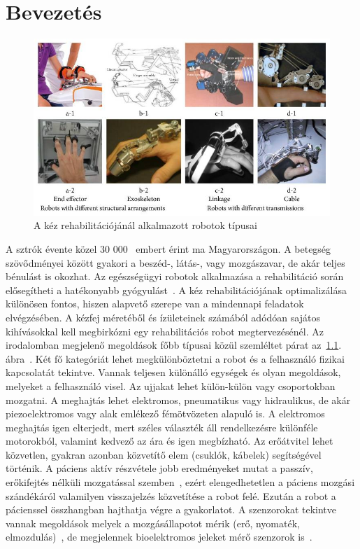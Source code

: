 \chapter{Bevezetés}

\begin{figure}[b!]
	\begin{center}
		\includegraphics[width=12cm]{images/hand_rehab_robot_types.jpeg}
		\caption{A kéz rehabilitációjánál alkalmazott robotok típusai}\label{fig:hand_rehab_robot_types}
	\end{center}
\end{figure}

A sztrók évente közel 30 000~\citep{Bereczki2023} embert érint ma Magyarországon. A betegség szövődményei között gyakori 
a beszéd-, látás-, vagy mozgászavar, de akár teljes bénulást is okozhat. Az egészségügyi robotok alkalmazása a 
rehabilitáció során elősegítheti a hatékonyabb gyógyulást~\citep{Chang2013}. A kéz rehabilitációjának optimalizálása 
különösen fontos, hiszen alapvető szerepe van a mindennapi feladatok elvégzésében. A kézfej méretéből és ízületeinek számából 
adódóan sajátos kihívásokkal kell megbirkózni egy rehabilitációs robot megtervezésénél.
Az irodalomban megjelenő megoldások főbb típusai közül szemléltet párat az~\ref{fig:hand_rehab_robot_types}. ábra~\citep{Yue2017}.
Két fő kategóriát lehet megkülönböztetni a robot és a felhasználó fizikai kapcsolatát tekintve. Vannak teljesen 
különálló egységek és olyan megoldások, melyeket a felhasználó visel. Az ujjakat lehet külön-külön vagy 
csoportokban mozgatni. A meghajtás lehet elektromos, pneumatikus vagy hidraulikus, de akár piezoelektromos vagy 
alak emlékező fémötvözeten alapuló is. A elektromos meghajtás igen elterjedt, mert széles választék áll rendelkezésre különféle motorokból, 
valamint kedvező az ára és igen megbízható. Az erőátvitel lehet közvetlen, gyakran azonban közvetítő elem (csuklók, kábelek) 
segítségével történik. A páciens aktív részvétele jobb eredményeket mutat a passzív, erőkifejtés nélküli mozgatással 
szemben~\citep{Remsik2016}, ezért elengedhetetlen a páciens mozgási szándékáról valamilyen visszajelzés közvetítése a robot felé.
Ezután a robot a pácienssel összhangban hajthatja végre a gyakorlatot.
A szenzorokat tekintve vannak megoldások melyek a mozgásállapotot mérik (erő, nyomaték, elmozdulás)~\citep{Bauer2021}, de megjelennek 
bioelektromos jeleket mérő szenzorok is~\citep{Satakogiou}. 

